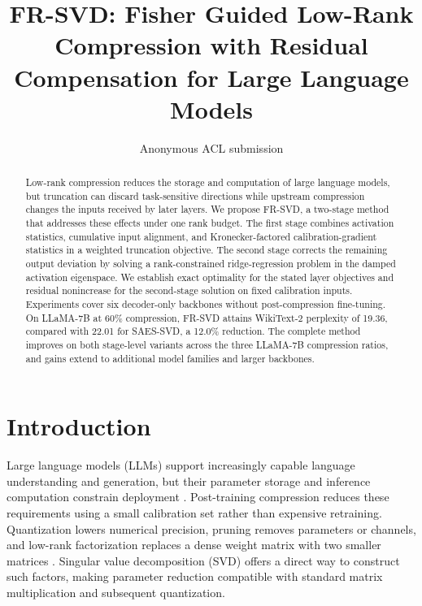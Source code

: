 \documentclass[11pt]{article}
\title{FR-SVD: Fisher Guided Low-Rank Compression with Residual Compensation for Large Language Models}
\author{Anonymous ACL submission}
\begin{document}
\raggedbottom
\maketitle

\begin{abstract}
Low-rank compression reduces the storage and computation of large language models, but truncation can discard task-sensitive directions while upstream compression changes the inputs received by later layers. We propose FR-SVD, a two-stage method that addresses these effects under one rank budget. The first stage combines activation statistics, cumulative input alignment, and Kronecker-factored calibration-gradient statistics in a weighted truncation objective. The second stage corrects the remaining output deviation by solving a rank-constrained ridge-regression problem in the damped activation eigenspace. We establish exact optimality for the stated layer objectives and residual nonincrease for the second-stage solution on fixed calibration inputs. Experiments cover six decoder-only backbones without post-compression fine-tuning. On LLaMA-7B at 60\% compression, FR-SVD attains WikiText-2 perplexity of 19.36, compared with 22.01 for SAES-SVD, a 12.0\% reduction. The complete method improves on both stage-level variants across the three LLaMA-7B compression ratios, and gains extend to additional model families and larger backbones.
\end{abstract}

\section{Introduction}\label{sec:intro}

Large language models (LLMs) support increasingly capable language understanding and generation, but their parameter storage and inference computation constrain deployment \citep{touvron2023llama,touvron2023llama2,dubey2024llama3}. Post-training compression reduces these requirements using a small calibration set rather than expensive retraining. Quantization lowers numerical precision, pruning removes parameters or channels, and low-rank factorization replaces a dense weight matrix with two smaller matrices \citep{frantar2023gptq,lin2023awq,frantar2023sparsegpt,ma2023llmpruner,ashkboos2024slicegpt}. Singular value decomposition (SVD) offers a direct way to construct such factors, making parameter reduction compatible with standard matrix multiplication and subsequent quantization.
\end{document}
